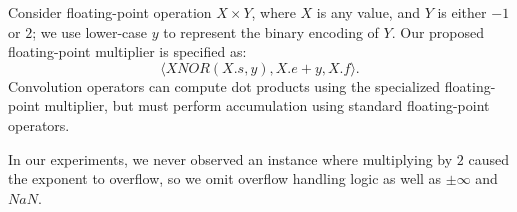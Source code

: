 Consider floating-point operation $X \times Y$, where $X$ is any value, and $Y$ is either $-1$ or $2$; we use lower-case $y$ to represent the binary encoding of $Y$. Our proposed floating-point multiplier is specified as:
\begin{equation}
    \langle XNOR(X.s, y), X.e + y, X.f\rangle.
\end{equation}
Convolution operators can compute dot products using the specialized floating-point multiplier, but must perform accumulation using standard floating-point operators. 

In our experiments, we never observed an instance where multiplying by $2$ caused the exponent to overflow, so we omit overflow handling logic as well as $\pm \infty$ and $NaN$. 


